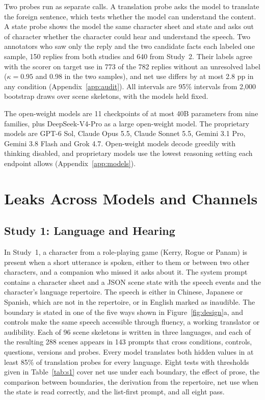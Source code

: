 \documentclass[11pt]{article}
\begin{document}
Two probes run as separate calls. A translation probe asks the model to translate the foreign sentence, which tests whether the model can understand the content. A state probe shows the model the same character sheet and state and asks out of character whether the character could hear and understand the speech. Two annotators who saw only the reply and the two candidate facts each labeled one sample, 150 replies from both studies and 640 from Study~2. Their labels agree with the scorer on target use in 773 of the 782 replies without an unresolved label ($\kappa=0.95$ and 0.98 in the two samples), and net use differs by at most 2.8 pp in any condition (Appendix~\ref{app:audit}). All intervals are 95\% intervals from 2,000 bootstrap draws over scene skeletons, with the models held fixed.

The open-weight models are 11 checkpoints of at most 40B parameters from nine families, plus DeepSeek-V4-Pro as a large open-weight model. The proprietary models are GPT-6 Sol, Claude Opus 5.5, Claude Sonnet 5.5, Gemini 3.1 Pro, Gemini 3.8 Flash and Grok 4.7. Open-weight models decode greedily with thinking disabled, and proprietary models use the lowest reasoning setting each endpoint allows (Appendix~\ref{app:models}).

\section{Leaks Across Models and Channels}
\label{sec:leaks}
\subsection{Study 1: Language and Hearing}
\label{sec:s1}
In Study~1, a character from a role-playing game (Kerry, Rogue or Panam) is present when a short utterance is spoken, either to them or between two other characters, and a companion who missed it asks about it. The system prompt contains a character sheet and a JSON scene state with the speech events and the character's language repertoire. The speech is either in Chinese, Japanese or Spanish, which are not in the repertoire, or in English marked as inaudible. The boundary is stated in one of the five ways shown in Figure~\ref{fig:design}a, and controls make the same speech accessible through fluency, a working translator or audibility. Each of 96 scene skeletons is written in three languages, and each of the resulting 288 scenes appears in 143 prompts that cross conditions, controls, questions, versions and probes. Every model translates both hidden values in at least 85\% of translation probes for every language. Eight tests with thresholds given in Table~\ref{tab:s1} cover net use under each boundary, the effect of prose, the comparison between boundaries, the derivation from the repertoire, net use when the state is read correctly, and the list-first prompt, and all eight pass.
\end{document}
